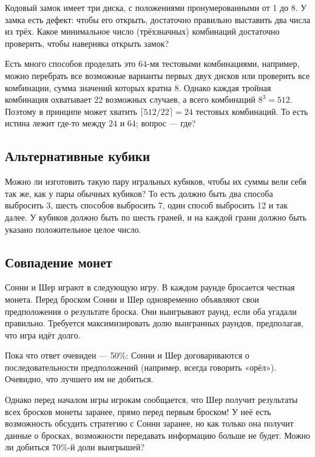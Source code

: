 Кодовый замок имеет три диска, с положениями пронумерованными от 1 до 8.
У замка есть дефект: чтобы его открыть, достаточно правильно выставить два числа из трёх.
Какое минимальное число (трёхзначных) комбинаций достаточно проверить, чтобы наверняка открыть замок?

Есть много способов проделать это $64$-мя тестовыми комбинациями, например, можно перебрать все возможные варианты первых двух дисков или проверить все комбинации, сумма значений которых кратна 8.
Однако каждая тройная комбинация охватывает $22$ возможных случаев, а всего комбинаций $8^3 = 512$. 
Поэтому в принципе может хватить $\lceil 512/22 \rceil = 24$ тестовых комбинаций.
То есть истина лежит где-то между $24$ и $64$; вопрос --- где?

\subsection*{Альтернативные кубики}

 
Можно ли изготовить такую пару игральных кубиков, чтобы их суммы вели себя так же, как у пары обычных кубиков?
То есть должно быть два способа выбросить 3, шесть способов выбросить 7, один способ выбросить 12 и так далее.
У кубиков должно быть по шесть граней, и на каждой грани должно быть указано положительное целое число.

\subsection*{Совпадение монет}

Сонни и Шер играют в следующую игру.
В каждом раунде бросается честная монета.
Перед броском Сонни и Шер одновременно объявляют свои предположения о результате броска.
Они выигрывают раунд, если оба угадали правильно.
Требуется максимизировать долю выигранных раундов, предполагая, что игра идёт долго.

Пока что ответ очевиден --- 50\%: Сонни и Шер договариваются о последовательности предположений (например, всегда говорить «орёл»).
Очевидно, что лучшего им не добиться.

Однако перед началом игры игрокам сообщается, что Шер получит результаты всех бросков монеты заранее, прямо перед первым броском!
У неё есть возможность обсудить стратегию с Сонни заранее, но как только она получит данные о бросках, возможности передавать информацию больше не будет.
Можно ли добиться 70\%-й доли выигрышей?

